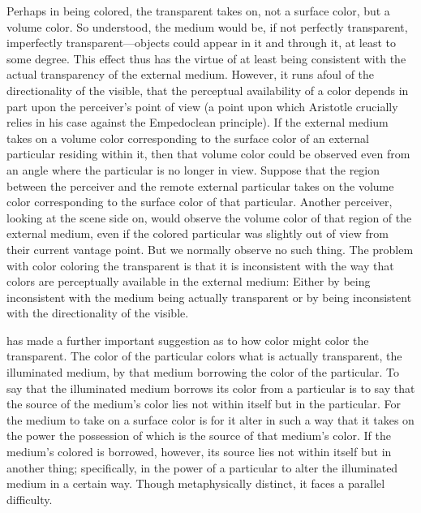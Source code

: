 Perhaps in being colored, the transparent takes on, not a surface color, but a volume color. So understood, the medium would be, if not perfectly transparent, imperfectly transparent---objects could appear in it and through it, at least to some degree. This effect thus has the virtue of at least being consistent with the actual transparency of the external medium. However, it runs afoul of the directionality of the visible, that the perceptual availability of a color depends in part upon the perceiver's point of view (a point upon which Aristotle crucially relies in his case against the Empedoclean principle). If the external medium takes on a volume color corresponding to the surface color of an external particular residing within it, then that volume color could be observed even from an angle where the particular is no longer in view. Suppose that the region between the perceiver and the remote external particular takes on the volume color corresponding to the surface color of that particular. Another perceiver, looking at the scene side on, would observe the volume color of that region of the external medium, even if the colored particular was slightly out of view from their current vantage point. But we normally observe no such thing. The problem with color coloring the transparent is that it is inconsistent with the way that colors are perceptually available in the external medium: Either by being inconsistent with the medium being actually transparent or by being inconsistent with the directionality of the visible.

\citet{Sorabji:2004fk} has made a further important suggestion as to how color might color the transparent. The color of the particular colors what is actually transparent, the illuminated medium, by that medium borrowing the color of the particular. To say that the illuminated medium borrows its color from a particular is to say that the source of the medium's color lies not within itself but in the particular. For the medium to take on a surface color is for it alter in such a way that it takes on the power the possession of which is the source of that medium's color. If the medium's colored is borrowed, however, its source lies not within itself but in another thing; specifically, in the power of a particular to alter the illuminated medium in a certain way. Though metaphysically distinct, it faces a parallel difficulty. 

